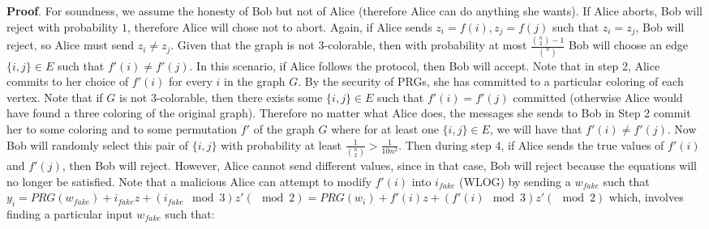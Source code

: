 \documentclass{article}
\begin{document}
\begin{enumerate}[noitemsep,topsep=\mdcompacttopsep,label=\alph*.]
\begin{mdbmarginx}{1ex}{0pt}{1ex}{0pt}%
\noindent{}\textbf{Proof}.  For soundness, we assume the honesty of Bob but not of Alice (therefore Alice can do anything she
wants). If Alice aborts, Bob will reject with probability $1$, therefore Alice will chose not to abort.
Again, if Alice sends $z_i = f(i), z_j = f(j)$ such that $z_i = z_j$, Bob will reject, so Alice must
send $z_i \neq z_j$. Given that the graph is not $3$-colorable, then with probability at most $\frac{{n \choose 2} - 1}{{n \choose}}$
Bob will choose an edge $\{i,j\} \in E$ such that $f'(i) \neq f'(j)$. In this scenario, if Alice follows
the protocol, then Bob will accept. Note that in step 2, Alice commits to her choice of $f'(i)$ for 
every $i$ in the graph $G$. By the security of PRGs, she has committed to a particular coloring of 
each vertex. Note that if $G$ is not $3$-colorable, then there exists some $\{i,j\} \in E$ such that
$f'(i) = f'(j)$ committed (otherwise Alice would have found a three coloring of the original graph). Therefore
no matter what Alice does, the messages she sends to Bob in Step 2 commit her to some coloring 
and to some permutation $f'$ of the
graph $G$ where for at least one $\{i,j\} \in E$, we will have that $f'(i) \neq f'(j)$. Now Bob will
randomly select this pair of $\{i,j\}$ with probability at least $\frac{1}{{n \choose 2}} > \frac{1}{10n^2}$.
Then during step 4, if Alice sends the true values of $f'(i) $ and $f'(j)$, then Bob will reject.
However, Alice cannot send different values, since in that case, Bob will reject because the equations
will no longer be satisfied. Note that a malicious Alice can attempt to modify $f'(i)$ into $i_{fake}$ (WLOG) by
sending a $w_{fake}$ such that $y_i = PRG(w_{fake}) + i_{fake}z + (i_{fake} \mod 3)z' (\mod 2) = PRG(w_{i}) + f'(i)z + (f'(i) \mod 3)z'(\mod 2)$
which, involves finding a particular input $w_{fake}$ such that:%

\end{mdbmarginx}
\end{enumerate}
\end{document}
